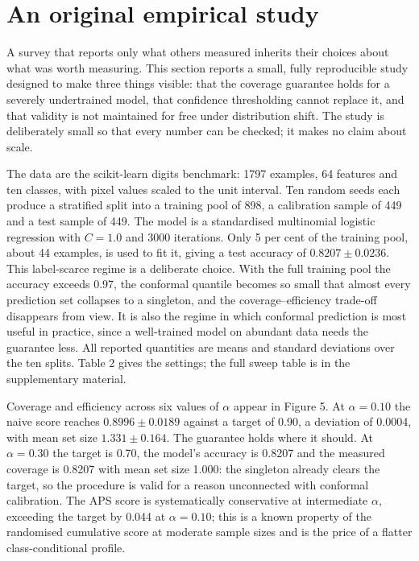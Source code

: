 \section{An original empirical study}

A survey that reports only what others measured inherits their choices about what
was worth measuring. This section reports a small, fully reproducible study
designed to make three things visible: that the coverage guarantee holds for a
severely undertrained model, that confidence thresholding cannot replace it, and
that validity is not maintained for free under distribution shift. The study is
deliberately small so that every number can be checked; it makes no claim about
scale.

The data are the scikit-learn digits benchmark: 1797 examples, 64 features and ten
classes, with pixel values scaled to the unit interval. Ten random seeds each
produce a stratified split into a training pool of 898, a calibration sample of
449 and a test sample of 449. The model is a standardised multinomial logistic
regression with $C=1.0$ and 3000 iterations. Only 5 per cent of the training pool,
about 44 examples, is used to fit it, giving a test accuracy of
$0.8207\pm0.0236$. This label-scarce regime is a deliberate choice. With the full
training pool the accuracy exceeds 0.97, the conformal quantile becomes so small
that almost every prediction set collapses to a singleton, and the
coverage--efficiency trade-off disappears from view. It is also the regime in which
conformal prediction is most useful in practice, since a well-trained model on
abundant data needs the guarantee less. All reported quantities are means and
standard deviations over the ten splits. Table 2 gives the settings; the full
sweep table is in the supplementary material.

Coverage and efficiency across six values of $\alpha$ appear in Figure 5. At
$\alpha=0.10$ the naive score reaches $0.8996\pm0.0189$ against a target of 0.90,
a deviation of 0.0004, with mean set size $1.331\pm0.164$. The guarantee holds
where it should. At $\alpha=0.30$ the target is 0.70, the model's accuracy is
0.8207 and the measured coverage is 0.8207 with mean set size 1.000: the
singleton already clears the target, so the procedure is valid for a reason
unconnected with conformal calibration. The APS score is systematically
conservative at intermediate $\alpha$, exceeding the target by 0.044 at
$\alpha=0.10$; this is a known property of the randomised cumulative score at
moderate sample sizes and is the price of a flatter class-conditional profile.

